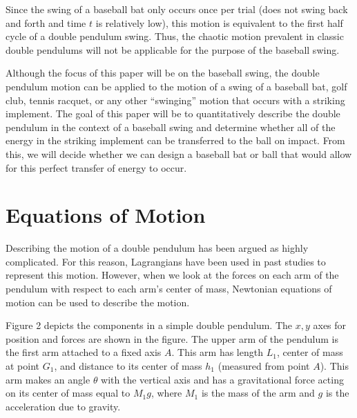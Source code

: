 \documentclass[%
 aip,
 amsmath,amssymb,
 reprint,%
 floatfix,%
]{revtex4-1}
\begin{document}
Since the swing of a baseball bat only occurs once per trial (does not swing back and forth and time $t$ is relatively low), this motion is equivalent to the first half cycle of a double pendulum swing. Thus, the chaotic motion prevalent in classic double pendulums will not be applicable for the purpose of the baseball swing.

Although the focus of this paper will be on the baseball swing, the double pendulum motion can be applied to the motion of a swing of a baseball bat, golf club, tennis racquet, or any other “swinging” motion that occurs with a striking implement. The goal of this paper will be to quantitatively describe the double pendulum in the context of a baseball swing and determine whether all of the energy in the striking implement can be transferred to the ball on impact. From this, we will decide whether we can design a baseball bat or ball that would allow for this perfect transfer of energy to occur.

\section{\label{sec:level2}Equations of Motion}

Describing the motion of a double pendulum has been argued as highly complicated\cite{Jorgensen1970}. For this reason, Lagrangians have been used in past studies to represent this motion. However, when we look at the forces on each arm of the pendulum with respect to each arm's center of mass, Newtonian equations of motion can be used to describe the motion.

Figure 2 depicts the components in a simple double pendulum. The $x,y$ axes for position and forces are shown in the figure. The upper arm of the pendulum is the first arm attached to a fixed axis $A$. This arm has length $L_1$, center of mass at point $G_1$, and distance to its center of mass $h_1$ (measured from point $A$). This arm makes an angle $\theta$ with the vertical axis and has a gravitational force acting on its center of mass equal to $M_1 g$, where $M_1$ is the mass of the arm and $g$ is the acceleration due to gravity.
\end{document}
